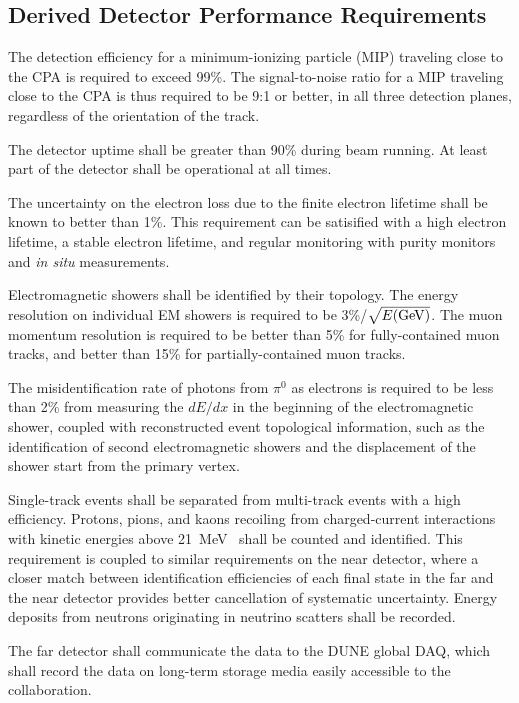 \subsection{Derived Detector Performance Requirements}

The detection efficiency for a minimum-ionizing particle (MIP)
traveling close to the CPA is required to exceed 99\%.  The
signal-to-noise ratio for a MIP traveling close to the CPA is thus
required to be 9:1 or better, in all three detection planes,
regardless of the orientation of the track.

The detector uptime shall be greater than 90\% during beam running.
At least part of the detector shall be operational at all times.

The uncertainty on the electron loss due to the finite electron
lifetime shall be known to better than 1\%.  This requirement can be
satisified with a high electron lifetime, a stable electron lifetime,
and regular monitoring with purity monitors and {\it in situ}
measurements.

Electromagnetic showers shall be identified by their topology.  The
energy resolution on individual EM showers is required to be
3\%/$\sqrt{E({\rm GeV})}$.  The muon momentum resolution is required
to be better than 5\% for fully-contained muon tracks, and better than
15\% for partially-contained muon tracks.

The misidentification rate of photons from $\pi^0$ as electrons is
required to be less than 2\% from measuring the $dE/dx$ in the
beginning of the electromagnetic shower, coupled with reconstructed
event topological information, such as the identification of second
electromagnetic showers and the displacement of the shower start from
the primary vertex.

Single-track events shall be separated from multi-track events with a
high efficiency.  Protons, pions, and kaons recoiling from 
charged-current interactions with kinetic energies above
21~MeV~\cite{argoneut_proton_spectra} shall be counted and
identified.  This requirement is coupled to similar requirements on the near detector,
where a closer match between identification efficiencies of each final state in the far
and the near detector provides better cancellation of systematic uncertainty.
Energy deposits from neutrons
originating in neutrino scatters shall be recorded.

The far detector shall communicate the data to the DUNE global DAQ,
which shall record the data on long-term storage media easily
accessible to the collaboration.

